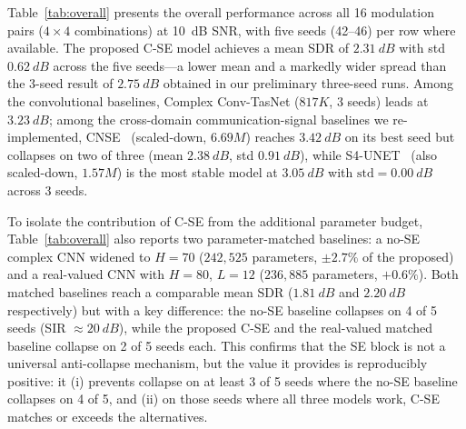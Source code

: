 \documentclass[twocolumn,english]{svjour3}
\begin{document}
Table~\ref{tab:overall} presents the overall performance across all 16 modulation pairs ($4\times 4$ combinations) at \SI{10}{dB} SNR, with five seeds (42--46) per row where available. The proposed C-SE model achieves a mean SDR of $\SI{2.31}{dB}$ with std $\SI{0.62}{dB}$ across the five seeds---a lower mean and a markedly wider spread than the 3-seed result of $\SI{2.75}{dB}$ obtained in our preliminary three-seed runs. Among the convolutional baselines, Complex Conv-TasNet ($817K$, 3 seeds) leads at $\SI{3.23}{dB}$; among the cross-domain communication-signal baselines we re-implemented, CNSE~\cite{hou2022single} (scaled-down, $6.69M$) reaches $\SI{3.42}{dB}$ on its best seed but collapses on two of three (mean $\SI{2.38}{dB}$, std $\SI{0.91}{dB}$), while S4-UNET~\cite{s4unet2026} (also scaled-down, $1.57M$) is the most stable model at $\SI{3.05}{dB}$ with $\text{std}=\SI{0.00}{dB}$ across 3 seeds.

To isolate the contribution of C-SE from the additional parameter budget, Table~\ref{tab:overall} also reports two parameter-matched baselines: a no-SE complex CNN widened to $H=70$ ($242{,}525$ parameters, $\pm 2.7\%$ of the proposed) and a real-valued CNN with $H=80$, $L=12$ ($236{,}885$ parameters, $+0.6\%$). Both matched baselines reach a comparable mean SDR ($\SI{1.81}{dB}$ and $\SI{2.20}{dB}$ respectively) but with a key difference: the no-SE baseline collapses on 4 of 5 seeds (SIR $\approx\SI{20}{dB}$), while the proposed C-SE and the real-valued matched baseline collapse on 2 of 5 seeds each. This confirms that the SE block is not a universal anti-collapse mechanism, but the value it provides is reproducibly positive: it (i) prevents collapse on at least 3 of 5 seeds where the no-SE baseline collapses on 4 of 5, and (ii) on those seeds where all three models work, C-SE matches or exceeds the alternatives.
\end{document}
